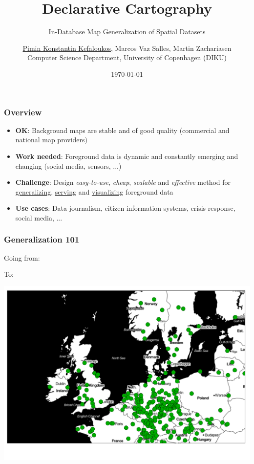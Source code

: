 \documentclass{beamer}
\title{Declarative Cartography}
\subtitle{In-Database Map Generalization of Spatial Datasets}
\author{\underline{Pimin Konstantin Kefaloukos}, Marcos Vaz Salles, Martin Zachariasen\\ \small{Computer Science Department, University of Copenhagen} (DIKU)}
\date{\today}
\begin{document}
\frame{\titlepage}

\frame
{
  \frametitle{Overview}
  \begin{center}
  \end{center}
  
  \begin{itemize}
  \item \textbf{OK}: Background maps are stable and of good quality (commercial and national map providers)
  \item \textbf{Work needed}: Foreground data is dynamic and constantly emerging and changing (social media, sensors, ...)
  \item \textbf{Challenge}: Design \emph{easy-to-use}, \emph{cheap}, \emph{scalable} and \emph{effective} method for \underline{generalizing}, \underline{serving} and \underline{visualizing} foreground data
  \item \textbf{Use cases}: Data journalism, citizen information systems, crisis response, social media, ...
  \end{itemize}

}

\frame
{
  \frametitle{Generalization 101}
  Going from:
  \begin{center}
  \end{center}
  To:
  \begin{center}
  \includegraphics[scale=0.19]{figs/generalized-tourism.pdf}
  \end{center}
}
\end{document}
